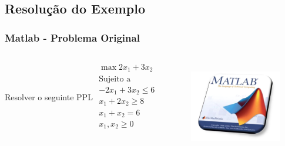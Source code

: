 \documentclass{beamer}
\begin{document}
\subsection{Resolução do Exemplo}
\begin{frame}
	\frametitle{Matlab - Problema Original}
	\begin{columns}
		\begin{column}{5cm}
			\begin{block}{Resolver o seguinte PPL}
				\centering
				$
					\begin{matrix}
						\max 2x_1+3x_2 \\
						\text{Sujeito a} \\
						-2x_1+3x_2 \le 6 \\
						x_1 + 2x_2 \ge 8 \\
						x_1 + x_2 = 6 \\
						x_1, x_2 \ge 0 \\
					\end{matrix}
				$
			\end{block}
		\end{column}
		{
		\begin{column}{5cm}
			\centering
			\includegraphics[width=4cm,height=4cm]{solver_matlab.png}
		\end{column}
		}
	\end{columns}
\end{frame}
\end{document}
